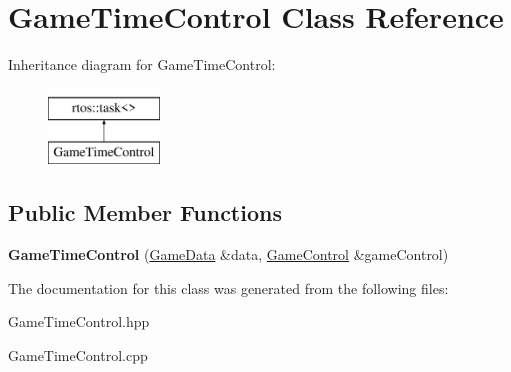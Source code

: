 \hypertarget{class_game_time_control}{}\section{Game\+Time\+Control Class Reference}
\label{class_game_time_control}
Inheritance diagram for Game\+Time\+Control\+:\begin{figure}[H]
\begin{center}
\leavevmode
\includegraphics[height=2.000000cm]{class_game_time_control}
\end{center}
\end{figure}
\subsection*{Public Member Functions}
\begin{DoxyCompactItemize}
\item 
{\bfseries Game\+Time\+Control} (\hyperlink{class_game_data}{Game\+Data} \&data, \hyperlink{class_game_control}{Game\+Control} \&game\+Control)\hypertarget{class_game_time_control_a138b91b4f0c8eb315bf453c17abce316}{}\label{class_game_time_control_a138b91b4f0c8eb315bf453c17abce316}

\end{DoxyCompactItemize}


The documentation for this class was generated from the following files\+:\begin{DoxyCompactItemize}
\item 
Game\+Time\+Control.\+hpp\item 
Game\+Time\+Control.\+cpp\end{DoxyCompactItemize}
